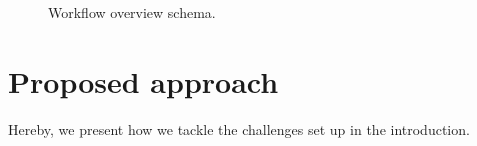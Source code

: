 \begin{figure}
	\begin{center}
		\caption{Workflow overview schema.}
		\label{fig:1}
	\end{center}
	\vspace{-15pt}
\end{figure}
\section{Proposed approach}
Hereby, we present how we tackle the challenges set up in the introduction.
